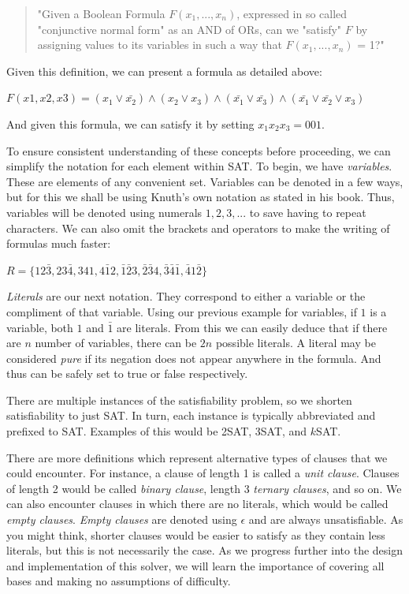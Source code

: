 \documentclass{article}
\begin{document}
\begin{quotation}
    "Given a Boolean Formula $F(x_1,...,x_n)$, expressed in so called "conjunctive normal form" as an AND of ORs, can we "satisfy" $F$ by assigning values to its variables in such a way that $F(x_1,...,x_n)$ = 1?"
\end{quotation}

Given this definition, we can present a formula as detailed above:

\begin{center}
    $F(x1,x2,x3) = (x_1 \vee \bar{x_2}) \wedge (x_2 \vee x_3) \wedge (\bar{x_1} \vee \bar{x_3}) \wedge (\bar{x_1} \vee \bar{x_2} \vee x_3)$
\end{center}

And given this formula, we can satisfy it by setting $x_1x_2x_3 = 001$.

To ensure consistent understanding of these concepts before proceeding, we can simplify the notation
for each element within SAT. To begin, we have \textit{variables}. These are elements of any
convenient set. Variables can be denoted in a few ways, but for this we shall be using Knuth's own
notation as stated in his book. Thus, variables will be denoted using numerals $1, 2, 3, ...$ to save
having to repeat characters. We can also omit the brackets and operators to make the writing of
formulas much faster:

\begin{center}
    $R = \{12\bar{3},23\bar{4},341,4\bar{1}2,\bar{1}\bar{2}3,\bar{2}\bar{3}4,\bar{3}\bar{4}\bar{1},\bar{4}1\bar{2}\}$
\end{center}

\textit{Literals} are our next notation. They correspond to either a variable or the compliment of
that variable. Using our previous example for variables, if $1$ is a variable, both $1$ and
$\bar{1}$ are literals. From this we can easily deduce that if there are $n$ number of variables,
there can be $2n$ possible literals. A literal may be considered \textit{pure} if its negation does
not appear anywhere in the formula. And thus can be safely set to true or false respectively.

There are multiple instances of the satisfiability problem, so we shorten satisfiability to just
SAT. In turn, each instance is typically abbreviated and prefixed to SAT. Examples of this would
be 2SAT, 3SAT, and $k$SAT.

There are more definitions which represent alternative types of clauses that we could encounter. For  instance, a clause of
length 1 is called a \textit{unit clause}. Clauses of length 2
would be called \textit{binary clause}, length 3 \textit{ternary clauses}, and so on. We can also
encounter clauses in which there are no literals, which would be called \textit{empty clauses}.
\textit{Empty clauses} are denoted using $\epsilon$ and are always unsatisfiable. As you might
think, shorter clauses would be easier to satisfy as they contain less literals, but this is not
necessarily the case. As we progress further into the design and implementation of this solver, we
will learn the importance of covering all bases and making no assumptions of difficulty.
\end{document}

